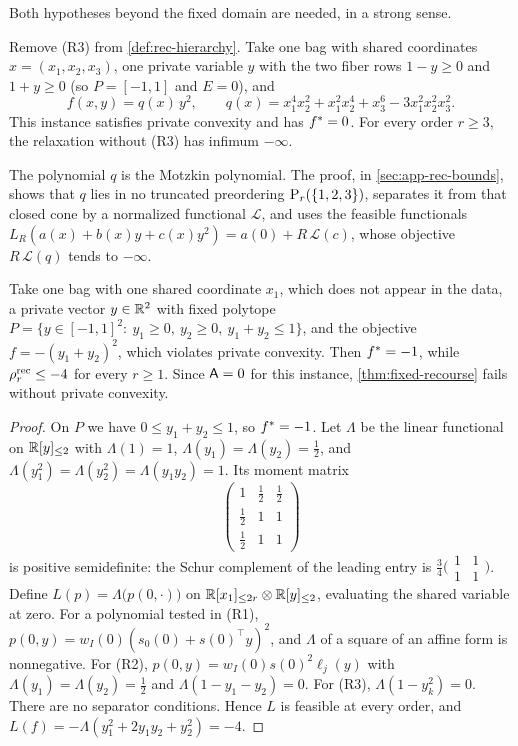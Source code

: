 Both hypotheses beyond the fixed domain are needed, in a strong sense.

\begin{proposition}
\label{prop:private-bounds-needed}
Remove (R3) from \cref{def:rec-hierarchy}. Take one bag with shared
coordinates $x=(x_1,x_2,x_3)$, one private variable $y$ with the two fiber
rows $1-y\ge0$ and $1+y\ge0$ (so $P=[-1,1]$ and $E=0$), and
\[
  f(x,y)=q(x)\,y^2,\qquad
  q(x)=x_1^4x_2^2+x_1^2x_2^4+x_3^6-3x_1^2x_2^2x_3^2 .
\]
This instance satisfies private convexity and has $f^{*}=0$. For every
order $r\ge3$, the relaxation without (R3) has infimum $-\infty$.
\end{proposition}

The polynomial $q$ is the Motzkin polynomial. The proof, in
\cref{sec:app-rec-bounds}, shows that $q$ lies in no truncated preordering
$\mathrm{P}_r(\{1,2,3\})$, separates it from that closed cone by a normalized
functional $\mathcal L$, and uses the feasible functionals
$L_R(a(x)+b(x)y+c(x)y^2)=a(0)+R\,\mathcal L(c)$, whose objective $R\,\mathcal L(q)$
tends to $-\infty$.

\begin{proposition}\label{prop:convexity-needed}
Take one bag with one shared coordinate $x_1$, which does not appear in the
data, a private vector $y\in\mathbb{R}^2$ with fixed polytope
$P=\{y\in[-1,1]^2:\ y_1\ge0,\ y_2\ge0,\ y_1+y_2\le1\}$, and the objective
$f=-(y_1+y_2)^2$, which violates private convexity. Then $f^{*}=-1$, while
$\rho^{\mathrm{rec}}_r\le-4$ for every $r\ge1$. Since $\mathsf{A}=0$ for this instance,
\cref{thm:fixed-recourse} fails without private convexity.
\end{proposition}

\begin{proof}
On $P$ we have $0\le y_1+y_2\le1$, so $f^{*}=-1$. Let $\Lambda$ be the
linear functional on $\mathbb{R}[y]_{\le 2}$ with $\Lambda(1)=1$,
$\Lambda(y_1)=\Lambda(y_2)=\tfrac12$, and $\Lambda(y_1^2)=\Lambda(y_2^2)=
\Lambda(y_1y_2)=1$. Its moment matrix
\[
  \begin{pmatrix}1&\tfrac12&\tfrac12\\ \tfrac12&1&1\\ \tfrac12&1&1\end{pmatrix}
\]
is positive semidefinite: the Schur complement of the leading entry is
$\tfrac34\bigl(\begin{smallmatrix}1&1\\1&1\end{smallmatrix}\bigr)$. Define
$L(p)=\Lambda\bigl(p(0,\cdot)\bigr)$ on $\mathbb{R}[x_1]_{\le 2r}\otimes\mathbb{R}[y]_{\le 2}$,
evaluating the shared variable at zero. For a polynomial tested in (R1),
$p(0,y)=w_I(0)(s_0(0)+s(0)^\top y)^2$, and $\Lambda$ of a square of an affine
form is nonnegative. For (R2), $p(0,y)=w_I(0)s(0)^2\ell_j(y)$ with
$\Lambda(y_1)=\Lambda(y_2)=\tfrac12$ and $\Lambda(1-y_1-y_2)=0$. For (R3),
$\Lambda(1-y_k^2)=0$. There are no separator conditions. Hence $L$ is
feasible at every order, and
$L(f)=-\Lambda(y_1^2+2y_1y_2+y_2^2)=-4$.
\end{proof}

